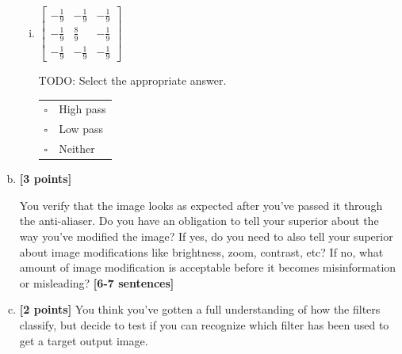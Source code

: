 \documentclass[11pt]{article}
\begin{document}
\begin{enumerate}[(a)]
\begin{enumerate}[(i)]
\item
$\begin{bmatrix}
    -\frac{1}{9} & -\frac{1}{9} & -\frac{1}{9} \\
    -\frac{1}{9} & \frac{8}{9} & -\frac{1}{9} \\
    -\frac{1}{9} & -\frac{1}{9} & -\frac{1}{9}
  \end{bmatrix}$
  \begin{tcolorbox}[colback=white!5!white,colframe=green!75!black]
  
TODO: Select the appropriate answer. %

\begin{tabular}[h]{ll}
$\square$ & High pass \\
$\square$ & Low pass \\
$\square$ & Neither \\
\end{tabular}
\end{tcolorbox}
\end{enumerate}

\pagebreak
\item \textbf{[3 points]} 
\begin{tcolorbox}[colback=orange!5!white,colframe=orange!75!black]
 You verify that the image looks as expected after you've passed it through the anti-aliaser. Do you have an obligation to tell your superior about the way you've modified the image? If yes, do you need to also tell your superior about image modifications like brightness, zoom, contrast, etc? If no, what amount of image modification is acceptable before it becomes misinformation or misleading? \textbf{[6-7 sentences]}
\end{tcolorbox}


\item \textbf{[2 points]}
You think you've gotten a full understanding of how the filters classify, but decide to test if you can recognize which filter has been used to get a target output image. 


\end{enumerate}
\end{document}

